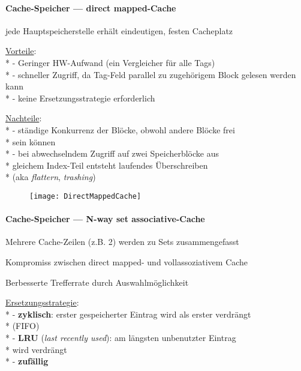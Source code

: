 \paragraph{Cache-Speicher --- direct mapped-Cache}
\begin{items}
	\item jede Hauptspeicherstelle erhält eindeutigen, festen Cacheplatz
	\item \underline{Vorteile}: \\*
		- Geringer HW-Aufwand (ein Vergleicher für alle Tags) \\*
		- schneller Zugriff, da Tag-Feld parallel zu zugehörigem Block gelesen werden kann \\*
		- keine Ersetzungsstrategie erforderlich
	\item \underline{Nachteile}: \\*
		- ständige Konkurrenz der Blöcke, obwohl andere Blöcke frei \\* \phantom{-} sein können \\*
		- bei abwechselndem Zugriff auf zwei Speicherblöcke aus \\* \phantom{-} gleichem Index-Teil entsteht laufendes Überschreiben \\* \phantom{-} (aka \emph{flattern}, \emph{trashing})
\end{items}
\begin{figure}[H]\centering\label{DirectMappedCache}\texttt{[image: DirectMappedCache]}\end{figure}

\paragraph{Cache-Speicher --- N-way set associative-Cache}
\begin{items}
	\item Mehrere Cache-Zeilen (z.B. 2) werden zu Sets zusammengefasst
	\item Kompromiss zwischen direct mapped- und vollassoziativem Cache
	\item Berbesserte Trefferrate durch Auswahlmöglichkeit
	\item \underline{Ersetzungsstrategie}: \\*
		- \textbf{zyklisch}: erster gespeicherter Eintrag wird als erster verdrängt \\* \phantom{-} (FIFO) \\*
		- \textbf{LRU} (\emph{last recently used}): am längsten unbenutzter Eintrag \\* \phantom{-} wird verdrängt \\*
		- \textbf{zufällig}
\end{items}


